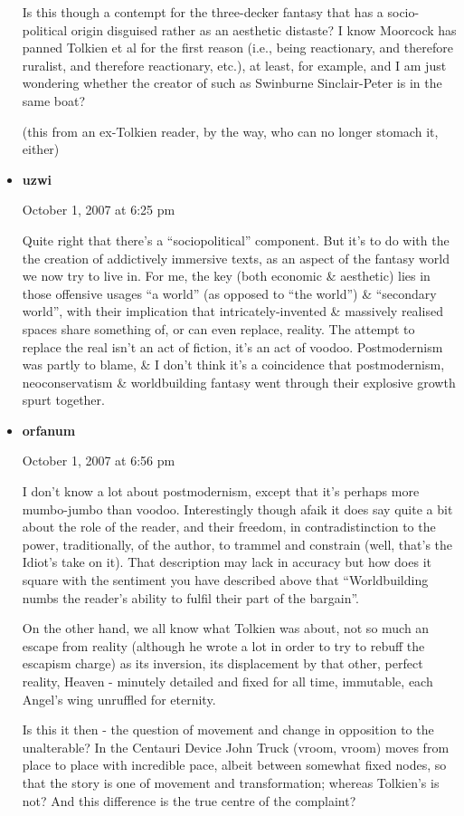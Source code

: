\documentclass[14pt]{extarticle}
\begin{document}
\begin{itemize}[leftmargin=*]
Is this though a contempt for the three-decker fantasy that has a socio-political origin disguised rather as an aesthetic distaste? I know Moorcock has panned Tolkien et al for the first reason (i.e., being reactionary, and therefore ruralist, and therefore reactionary, etc.), at least, for example, and I am just wondering whether the creator of such as Swinburne Sinclair-Peter is in the same boat?

(this from an ex-Tolkien reader, by the way, who can no longer stomach it, either)

\item \textbf{uzwi}

October 1, 2007 at 6:25 pm

Quite right that there’s a “sociopolitical” component. But it’s to do with the the creation of addictively immersive texts, as an aspect of the fantasy world we now try to live in. For me, the key (both economic \& aesthetic) lies in those offensive usages “a world” (as opposed to “the world”) \& “secondary world”, with their implication that intricately-invented \& massively realised spaces share something of, or can even replace, reality. The attempt to replace the real isn’t an act of fiction, it’s an act of voodoo. Postmodernism was partly to blame, \& I don’t think it’s a coincidence that postmodernism, neoconservatism \& worldbuilding fantasy went through their explosive growth spurt together.

\item \textbf{orfanum}

October 1, 2007 at 6:56 pm

I don’t know a lot about postmodernism, except that it’s perhaps more mumbo-jumbo than voodoo. Interestingly though afaik it does say quite a bit about the role of the reader, and their freedom, in contradistinction to the power, traditionally, of the author, to trammel and constrain (well, that’s the Idiot’s take on it). That description may lack in accuracy but how does it square with the sentiment you have described above that “Worldbuilding numbs the reader’s ability to fulfil their part of the bargain”.

On the other hand, we all know what Tolkien was about, not so much an escape from reality (although he wrote a lot in order to try to rebuff the escapism charge) as its inversion, its displacement by that other, perfect reality, Heaven - minutely detailed and fixed for all time, immutable, each Angel’s wing unruffled for eternity.

Is this it then - the question of movement and change in opposition to the unalterable? In the Centauri Device John Truck (vroom, vroom) moves from place to place with incredible pace, albeit between somewhat fixed nodes, so that the story is one of movement and transformation; whereas Tolkien’s is not? And this difference is the true centre of the complaint?


\end{itemize}
\end{document}
